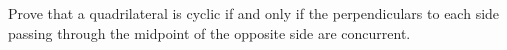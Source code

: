 Prove that a quadrilateral is cyclic if and only if
the perpendiculars to each side
passing through the midpoint of the opposite side
are concurrent.
